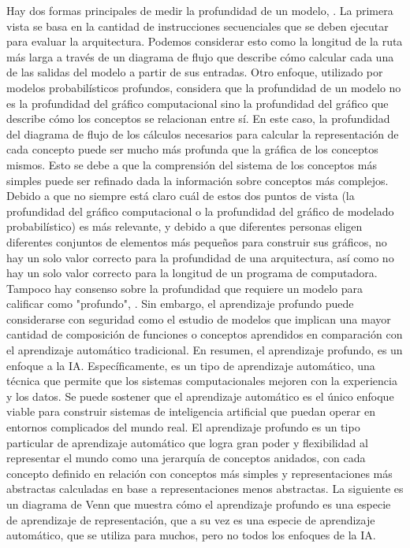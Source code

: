 	\vskip 0.4cm 
	Hay dos formas principales de medir la profundidad de un modelo, \citep{Goodfellow-et-al-2016}. La primera vista se basa en la cantidad de instrucciones secuenciales que se deben ejecutar para evaluar la arquitectura. Podemos considerar esto como la longitud de la ruta más larga a través de un diagrama de flujo que describe cómo calcular cada una de las salidas del modelo a partir de sus entradas. Otro enfoque, utilizado por modelos probabilísticos profundos, considera que la profundidad de un modelo no es la profundidad del gráfico computacional sino la profundidad del gráfico que describe cómo los conceptos se relacionan entre sí. En este caso, la profundidad del diagrama de flujo de los cálculos necesarios para calcular la representación de cada concepto puede ser mucho más profunda que la gráfica de los conceptos mismos. Esto se debe a que la comprensión del sistema de los conceptos más simples puede ser refinado dada la información sobre conceptos más complejos.
	\vskip 0.4cm 
	Debido a que no siempre está claro cuál de estos dos puntos de vista (la profundidad del gráfico computacional o la profundidad del gráfico de modelado probabilístico) es más relevante, y debido a que diferentes personas eligen diferentes conjuntos de elementos más pequeños para construir sus gráficos, no hay un solo valor correcto para la profundidad de una arquitectura, así como no hay un solo valor correcto para la longitud de un programa de computadora. Tampoco hay consenso sobre la profundidad que requiere un modelo para calificar como "profundo", \citep{Goodfellow-et-al-2016}. Sin embargo, el aprendizaje profundo puede considerarse con seguridad como el estudio de modelos que implican una mayor cantidad de composición de funciones o conceptos aprendidos en comparación con el aprendizaje automático tradicional.
	\vskip 0.4cm 
	En resumen, el aprendizaje profundo, es un enfoque a la IA. Específicamente, es un tipo de aprendizaje automático, una técnica que permite que los sistemas computacionales mejoren con la experiencia y los datos. Se puede sostener que el aprendizaje automático es el único enfoque viable para construir sistemas de inteligencia artificial que puedan operar en entornos complicados del mundo real. El aprendizaje profundo es un tipo particular de aprendizaje automático que logra gran poder y flexibilidad al representar el mundo como una jerarquía de conceptos anidados, con cada concepto definido en relación con conceptos más simples y representaciones más abstractas calculadas en base a representaciones menos abstractas. La siguiente es un diagrama de Venn que muestra cómo el aprendizaje profundo es una especie de aprendizaje de representación, que a su vez es una especie de aprendizaje automático, que se utiliza para muchos, pero no todos los enfoques de la IA. 

